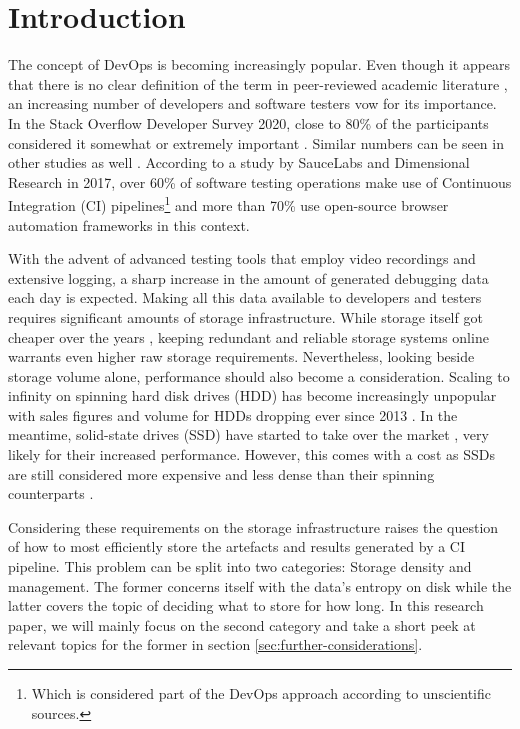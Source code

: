 \section{Introduction}

    The concept of DevOps is becoming increasingly popular. Even though it appears that there is no clear definition of the term in peer-reviewed academic literature \cite{devops-definition}, an increasing number of developers and software testers vow for its importance. In the Stack Overflow Developer Survey 2020, close to 80\% of the participants considered it somewhat or extremely important \cite{devops-importance}. Similar numbers can be seen in other studies as well \cite{devops}. According to a study by SauceLabs and Dimensional Research in 2017, over 60\% of software testing operations make use of Continuous Integration (CI) pipelines\footnote{Which is considered part of the DevOps approach according to unscientific sources.} and more than 70\% use open-source browser automation frameworks in this context.
    
    With the advent of advanced testing tools that employ video recordings and extensive logging, a sharp increase in the amount of generated debugging data each day is expected. Making all this data available to developers and testers requires significant amounts of storage infrastructure. While storage itself got cheaper over the years \cite{hdd-prices}, keeping redundant and reliable storage systems online warrants even higher raw storage requirements. Nevertheless, looking beside storage volume alone, performance should also become a consideration. Scaling to infinity on spinning hard disk drives (HDD) has become increasingly unpopular with sales figures and volume for HDDs dropping ever since 2013 \cite{hdd-shipments-1} \cite{hdd-shipments-2}. In the meantime, solid-state drives (SSD) have started to take over the market \cite{ssd-sales}, very likely for their increased performance. However, this comes with a cost as SSDs are still considered more expensive and less dense than their spinning counterparts \cite{ssd-cost}.
    
    Considering these requirements on the storage infrastructure raises the question of how to most efficiently store the artefacts and results generated by a CI pipeline. This problem can be split into two categories: Storage density and management. The former concerns itself with the data's entropy on disk while the latter covers the topic of deciding what to store for how long. In this research paper, we will mainly focus on the second category and take a short peek at relevant topics for the former in section \ref{sec:further-considerations}.
    
